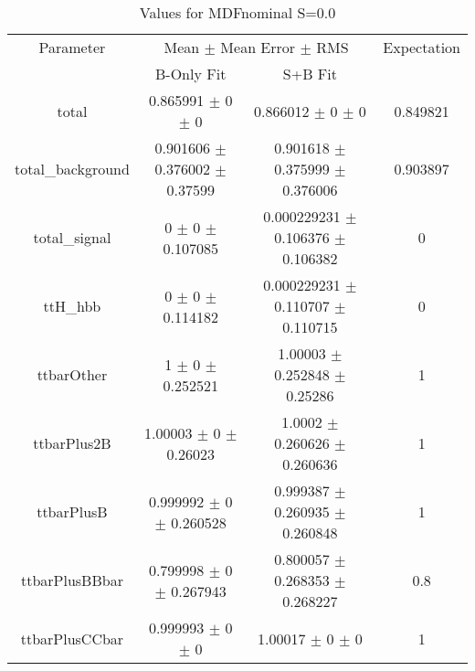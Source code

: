 \begin{table}
\centering
\caption{Values for MDFnominal S=0.0}
\begin{tabular}{cccc}
\toprule
Parameter & \multicolumn{2}{c}{Mean $\pm$ Mean Error $\pm$ RMS} & Expectation\\
 & B-Only Fit & S+B Fit & \\
\midrule
total & \num{0.865991} $\pm$ \num{0} $\pm$ \num{0} & \num{0.866012} $\pm$ \num{0} $\pm$ \num{0} & \num{0.849821}\\
total\_background & \num{0.901606} $\pm$ \num{0.376002} $\pm$ \num{0.37599} & \num{0.901618} $\pm$ \num{0.375999} $\pm$ \num{0.376006} & \num{0.903897}\\
total\_signal & \num{0} $\pm$ \num{0} $\pm$ \num{0.107085} & \num{0.000229231} $\pm$ \num{0.106376} $\pm$ \num{0.106382} & \num{0}\\
ttH\_hbb & \num{0} $\pm$ \num{0} $\pm$ \num{0.114182} & \num{0.000229231} $\pm$ \num{0.110707} $\pm$ \num{0.110715} & \num{0}\\
ttbarOther & \num{1} $\pm$ \num{0} $\pm$ \num{0.252521} & \num{1.00003} $\pm$ \num{0.252848} $\pm$ \num{0.25286} & \num{1}\\
ttbarPlus2B & \num{1.00003} $\pm$ \num{0} $\pm$ \num{0.26023} & \num{1.0002} $\pm$ \num{0.260626} $\pm$ \num{0.260636} & \num{1}\\
ttbarPlusB & \num{0.999992} $\pm$ \num{0} $\pm$ \num{0.260528} & \num{0.999387} $\pm$ \num{0.260935} $\pm$ \num{0.260848} & \num{1}\\
ttbarPlusBBbar & \num{0.799998} $\pm$ \num{0} $\pm$ \num{0.267943} & \num{0.800057} $\pm$ \num{0.268353} $\pm$ \num{0.268227} & \num{0.8}\\
ttbarPlusCCbar & \num{0.999993} $\pm$ \num{0} $\pm$ \num{0} & \num{1.00017} $\pm$ \num{0} $\pm$ \num{0} & \num{1}\\
\bottomrule
\end{tabular}
\end{table}